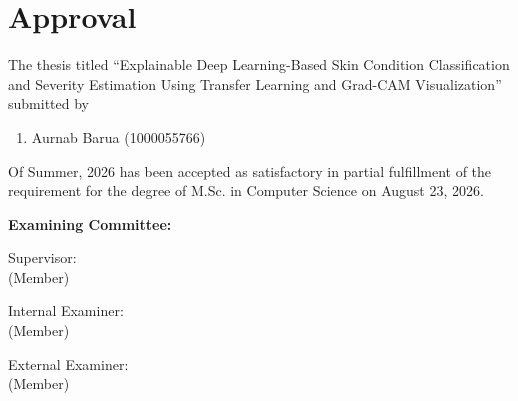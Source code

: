 \section*{Approval}

The thesis titled “Explainable Deep Learning-Based Skin Condition Classification
and Severity Estimation Using Transfer Learning and Grad-CAM
Visualization” submitted by 
\begin{enumerate}
  \item Aurnab Barua (1000055766) 
\end{enumerate}

Of Summer, 2026 has been accepted as satisfactory in partial fulfillment of the requirement for the degree of M.Sc. in Computer Science on August 23, 2026. 

\vspace{0.5cm}
\textbf{Examining Committee:}

\vspace{1cm}

Supervisor:\\
(Member)
\begin{center}
    \hspace{7cm}  \hspace{1cm} 
\end{center}

Internal Examiner:\\
(Member)
\begin{center}
    \hspace{7cm}  \hspace{1cm} 
\end{center}

External Examiner:\\
(Member)
\begin{center}
    \hspace{7cm}  \hspace{1cm} 
\end{center}


